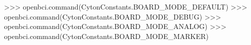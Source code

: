 \begin{python}
>>> openbci.command(CytonConstants.BOARD_MODE_DEFAULT)
>>> openbci.command(CytonConstants.BOARD_MODE_DEBUG)
>>> openbci.command(CytonConstants.BOARD_MODE_ANALOG)
>>> openbci.command(CytonConstants.BOARD_MODE_MARKER)
\end{python}